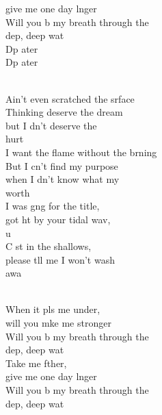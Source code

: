 \begin{cancion}
\begin{chorus}
	give me one day lnger\\
	Will you b my breath through the \\
	dep, deep wat\\
\jump
	Dp ater    \\
	Dp ater    \\
	\end{chorus}%
	\jump\\
\jump
	Ain't even scratched the srface\\
	Thinking  deserve the dream \\
	but I dn't deserve the \\
	hurt\\
	I want the flame without the brning\\
	But I cn't find my purpose \\
	when I dn't know what my \\
	worth \\
\jump
	I was gng for the title, \\
	got ht by your tidal wav, \\
	u\\
	C st in the shallows, \\
	please tll me I won't wash\\
	 awa  \\\jump\\
	\begin{chorus}%
	When it pls me under, \\
	will you mke me stronger\\
	Will you b my breath through the \\
	dep, deep wat\\
	Take me fther, \\
	give me one day lnger\\
	Will you b my breath through the \\
	dep, deep wat\\

\end{chorus}
\end{cancion}
